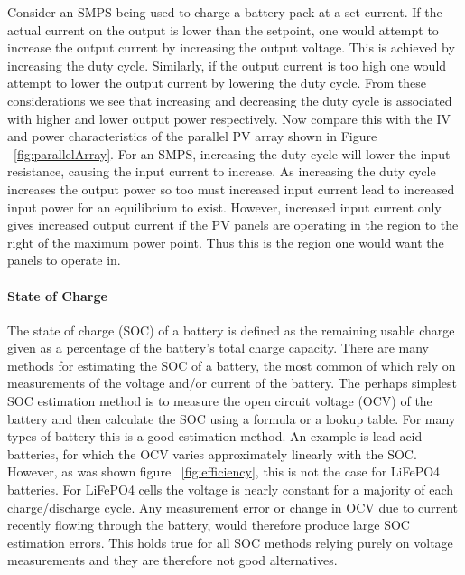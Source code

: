 \documentclass[a4paper]{article}
\begin{document}
Consider an SMPS being used to charge a battery pack at a set current. If 
the actual current on the output is lower than the setpoint, one would 
attempt to increase the output current by increasing the output voltage. 
This is achieved by increasing the duty cycle. Similarly, if the output 
current is too high one would attempt to lower the output current by 
lowering the duty cycle. From these considerations we see that increasing 
and decreasing the duty cycle is associated with higher and lower output power 
respectively. Now compare this with the IV and power characteristics of the 
parallel PV array shown in Figure ~\ref{fig:parallelArray}. For an SMPS, 
increasing the duty cycle will lower the input resistance, causing the input 
current to increase. As increasing the duty cycle increases the output 
power so too must increased input current lead to increased input power for 
an equilibrium to exist. However, increased input current only gives increased 
output current if the PV panels are operating in the region to the right of the 
maximum power point. Thus this is the region one would want the panels to operate in. 

\paragraph*{State of Charge}
The state of charge (SOC) of a battery is defined as the remaining usable charge 
given as a percentage of the battery’s total charge capacity\cite{DICKINSON2009452}. There are many 
methods for  estimating the SOC of a battery, the most common of which rely on 
measurements of the voltage and/or current of the battery\cite{DANKO2019186}. The perhaps 
simplest SOC estimation method is to measure the open circuit voltage (OCV) 
of the battery and then calculate the SOC using a formula or a lookup table. 
For many types of battery this is a good estimation method. An example is 
lead-acid batteries, for which the OCV varies approximately linearly with the 
SOC. However, as was shown figure ~\ref{fig:efficiency}, this is not the case 
for LiFePO4 batteries. For LiFePO4 cells the voltage is nearly constant for 
a majority of each charge/discharge cycle. Any measurement error or change in 
OCV due to current recently flowing through the battery, would therefore produce large 
SOC estimation errors. This holds true for all SOC methods relying purely on 
voltage measurements and they are therefore not good alternatives. 
\end{document}
